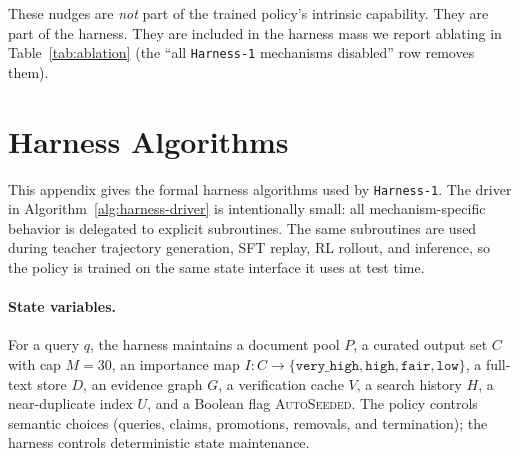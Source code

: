 \documentclass{article}
\newcommand{\sys}{\texttt{Harness-1}\xspace}
\begin{document}
These nudges are \emph{not} part of the trained policy's
intrinsic capability. They are part of the harness. They are
included in the harness mass we report ablating in
Table~\ref{tab:ablation} (the ``all \sys mechanisms disabled''
row removes them).

\section{Harness Algorithms}
\label{app:harness-algorithms}

This appendix gives the formal harness algorithms used by \sys. The
driver in Algorithm~\ref{alg:harness-driver} is intentionally small:
all mechanism-specific behavior is delegated to explicit subroutines.
The same subroutines are used during teacher trajectory generation,
SFT replay, RL rollout, and inference, so the policy is trained on the
same state interface it uses at test time.

\paragraph{State variables.}
For a query $q$, the harness maintains a document pool $P$, a curated
output set $C$ with cap $M{=}30$, an importance map $I:C\to
\{\texttt{very\_high},\texttt{high},\texttt{fair},\texttt{low}\}$, a
full-text store $D$, an evidence graph $G$, a verification cache $V$,
a search history $H$, a near-duplicate index $U$, and a Boolean flag
\textsc{AutoSeeded}. The policy controls semantic choices (queries,
claims, promotions, removals, and termination); the harness controls
deterministic state maintenance.
\end{document}
